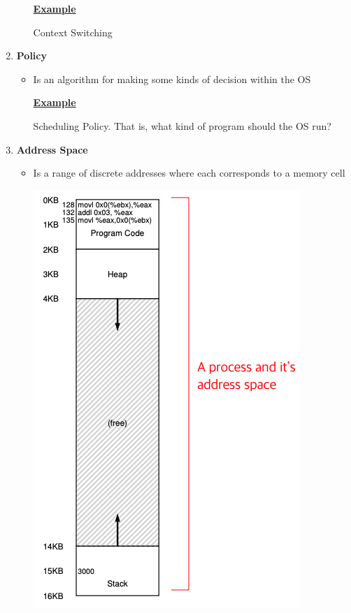 \documentclass[12pt]{article}
\begin{document}
\begin{mdframed}
\begin{enumerate}[1.]
\begin{itemize}
        \bigskip

        \underline{\textbf{Example}}

        \bigskip

        Context Switching
    \end{itemize}
    \item \textbf{Policy}

    \begin{itemize}
        \item Is an algorithm for making some kinds of decision within the OS

        \bigskip

        \underline{\textbf{Example}}

        \bigskip

        Scheduling Policy. That is, what kind of program should the OS run?
    \end{itemize}
    \item \textbf{Address Space}
    \begin{itemize}
        \item Is a range of discrete addresses where each corresponds to a memory cell

        \bigskip

        \begin{center}
        \includegraphics[width=0.5\linewidth]{images/notes_4_1.png}
        \end{center}


\end{itemize}
\end{enumerate}
\end{mdframed}
\end{document}
